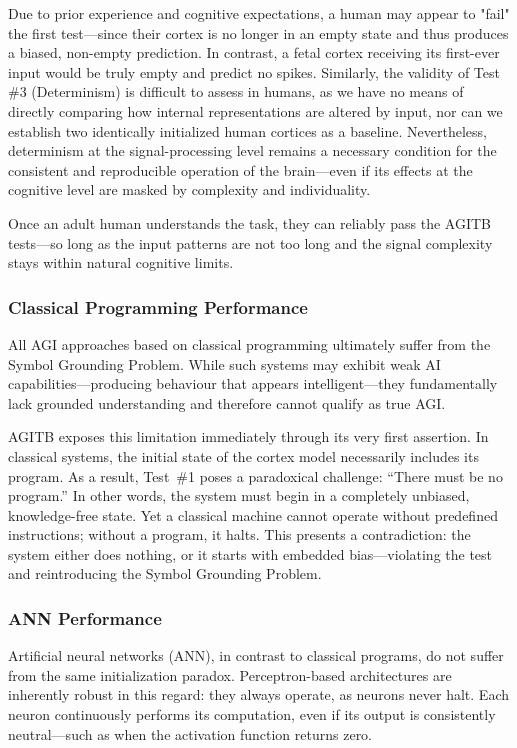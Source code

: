 \documentclass{article}
\begin{document}
Due to prior experience and cognitive expectations, a human may appear to "fail" the first test—since their cortex is no longer in an empty state and thus produces a biased, non-empty prediction. In contrast, a fetal cortex receiving its first-ever input would be truly empty and predict no spikes. Similarly, the validity of Test \#3 (Determinism) is difficult to assess in humans, as we have no means of directly comparing how internal representations are altered by input, nor can we establish two identically initialized human cortices as a baseline. Nevertheless, determinism at the signal-processing level remains a necessary condition for the consistent and reproducible operation of the brain—even if its effects at the cognitive level are masked by complexity and individuality.

Once an adult human understands the task, they can reliably pass the AGITB tests—so long as the input patterns are not too long and the signal complexity stays within natural cognitive limits.


\subsubsection{Classical Programming Performance}

All AGI approaches based on classical programming ultimately suffer from the Symbol Grounding Problem. While such systems may exhibit weak AI capabilities—producing behaviour that appears intelligent—they fundamentally lack grounded understanding and therefore cannot qualify as true AGI.

AGITB exposes this limitation immediately through its very first assertion. In classical systems, the initial state of the cortex model necessarily includes its program. As a result, Test~\#1 poses a paradoxical challenge: “There must be no program.” In other words, the system must begin in a completely unbiased, knowledge-free state. Yet a classical machine cannot operate without predefined instructions; without a program, it halts. This presents a contradiction: the system either does nothing, or it starts with embedded bias—violating the test and reintroducing the Symbol Grounding Problem.


\subsubsection{ANN Performance}

Artificial neural networks (ANN), in contrast to classical programs, do not suffer from the same initialization paradox. Perceptron-based architectures are inherently robust in this regard: they always operate, as neurons never halt. Each neuron continuously performs its computation, even if its output is consistently neutral—such as when the activation function returns zero.
\end{document}
